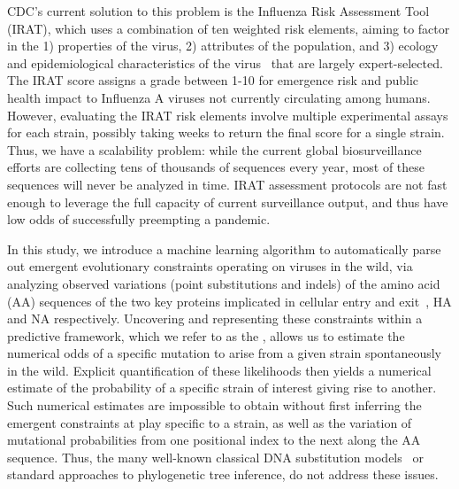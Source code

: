\documentclass[onecolumn, compsoc,10pt]{IEEEtran}
\begin{document}
CDC's current solution to this problem is the Influenza Risk Assessment Tool (IRAT), which  uses a combination of ten weighted risk elements, aiming to factor in the   1) properties of the virus, 2) attributes of the population, and 3) ecology and epidemiological characteristics of the virus~\cite{Influenz24:online} that are largely  expert-selected. The IRAT score assigns  a grade between 1-10 for emergence risk and public health impact to Influenza A viruses not currently circulating among humans. However, evaluating the IRAT risk elements  involve multiple experimental assays for each strain, possibly taking  weeks to return the final   score for a single strain. Thus, we have a scalability problem: while  the current global biosurveillance efforts are collecting tens of thousands of sequences every year, most of these sequences will never be analyzed in time. IRAT assessment protocols are  not fast enough to leverage the full capacity of current surveillance output, and thus have low odds of successfully  preempting a pandemic.

In this study, we introduce a machine learning algorithm to automatically parse out emergent evolutionary constraints operating on \infl viruses in the wild, via analyzing observed variations (point substitutions and indels) of the  amino acid (AA)  sequences  of the two key proteins implicated  in cellular entry and exit~\cite{gamblin2010influenza}, HA and NA respectively. Uncovering and representing these constraints within a predictive framework, which we refer to as the \enet, allows us to estimate the numerical odds of a specific mutation to arise from a given strain  spontaneously in the wild. Explicit quantification of these likelihoods then yields a numerical estimate of the probability of a specific strain of interest giving rise to another. Such numerical estimates are impossible to obtain without first inferring the emergent constraints at play specific to a strain,  as well as  the variation of mutational probabilities from one positional index to the next along the AA sequence. Thus, the many well-known classical  DNA  substitution models~\cite{posada1998modeltest} or standard approaches to phylogenetic tree inference, do not address these issues. 
\end{document}
